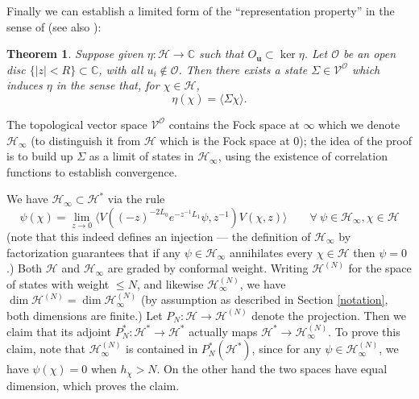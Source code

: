 \documentclass[a4paper,12pt]{article}
\newcommand{\C}{{\mathbb C}}
\newcommand{\uu}{{\mathbf u}}
\newcommand{\F}{{\mathcal H}}
\newcommand{\OO}{{\mathcal O}}
\newcommand{\V}{{\mathcal V}}
\newcommand{\IP}[1]{\langle#1\rangle}
\newtheorem{thm}[defn]{Theorem}
\newcommand{\oproof}[1]{\noindent {\bf Proof#1.\ }}
\begin{document}
Finally we can establish a limited form of 
the ``representation property'' in the sense of \cite{GG} (see also \cite{Montague}):

\begin{thm} Suppose given $\eta: \F \to \C$ such that $O_\uu \subset \ker \eta$.  Let $\OO$ be an open disc $\{ |z| < R \} \subset \C$, with all $u_i \notin \OO$.
Then there exists a state $\Sigma \in \V^\OO$ which induces $\eta$ in the sense that, for $\chi \in \F$,
\begin{equation}
\eta(\chi) = \IP{\Sigma \chi}.
\end{equation}
\end{thm}
\oproof{}  The topological vector space $\V^\OO$ contains the Fock space at $\infty$
which we denote $\F_\infty$ (to distinguish it from $\F$ which is the Fock space at $0$); the idea of the proof is to build up $\Sigma$ as a limit
of states in $\F_\infty$, using the existence of correlation functions to establish convergence.

We have $\F_\infty \subset \F^*$ via the rule \cite{Greview}
\begin{equation}
\psi(\chi) = \lim_{z \to 0} \IP{V((-z)^{-2 L_0} e^{-z^{-1} L_1} \psi, z^{-1}) V(\chi, z)} \qquad \forall \ \psi \in \F_\infty, \chi \in \F
\end{equation}
(note that this indeed defines an injection --- the definition of $\F_\infty$ by factorization guarantees that if any $\psi \in \F_\infty$ annihilates
every $\chi \in \F$ then $\psi = 0$.)  Both $\F$ and $\F_\infty$ are graded by conformal weight.
Writing $\F^{(N)}$ for the space of states with weight $\le N$, and likewise $\F^{(N)}_\infty$, 
we have $\dim \F^{(N)} = \dim \F^{(N)}_\infty$ (by assumption as described
in Section \ref{notation}, both dimensions are finite.)  
Let $P_N: \F \to \F^{(N)}$ denote the projection.  Then we claim that its adjoint $P_N^*: \F^* \to \F^*$
actually maps $\F^* \to \F^{(N)}_\infty$.  To prove this claim, note that $\F^{(N)}_\infty$ is contained in $P_N^*(\F^*)$,
since for any $\psi \in \F^{(N)}_\infty$, we have $\psi(\chi) = 0$ when $h_\chi > N$.  On the other hand the two spaces have equal 
dimension, which proves the claim.
\end{document}
